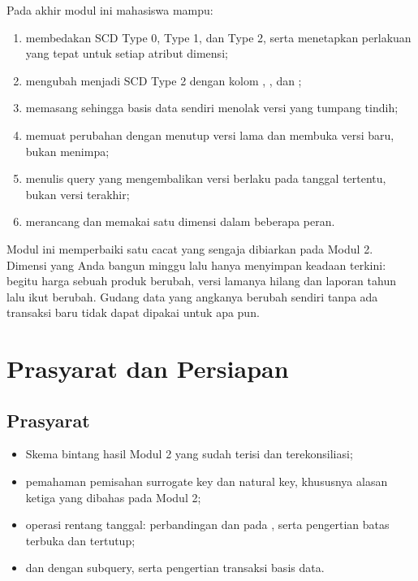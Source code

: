 \begin{capaian}
Pada akhir modul ini mahasiswa mampu:
\begin{enumerate}[leftmargin=1.4em]
  \item membedakan SCD Type 0, Type 1, dan Type 2, serta menetapkan perlakuan
        yang tepat untuk setiap atribut dimensi;
  \item mengubah  menjadi SCD Type 2 dengan kolom
        , , dan
        ;
  \item memasang  sehingga basis data sendiri
        menolak versi yang tumpang tindih;
  \item memuat perubahan dengan menutup versi lama dan membuka versi baru,
        bukan menimpa;
  \item menulis query yang mengembalikan versi berlaku pada tanggal tertentu,
        bukan versi terakhir;
  \item merancang  dan memakai satu dimensi dalam
        beberapa peran.
\end{enumerate}
\end{capaian}

Modul ini memperbaiki satu cacat yang sengaja dibiarkan pada Modul 2. Dimensi
yang Anda bangun minggu lalu hanya menyimpan keadaan terkini: begitu harga
sebuah produk berubah, versi lamanya hilang dan laporan tahun lalu ikut
berubah. Gudang data yang angkanya berubah sendiri tanpa ada transaksi baru
tidak dapat dipakai untuk apa pun.

\section{Prasyarat dan Persiapan}

\subsection{Prasyarat}

\begin{itemize}
  \item Skema bintang hasil Modul 2 yang sudah terisi dan terekonsiliasi;
  \item pemahaman pemisahan surrogate key dan natural key, khususnya alasan
        ketiga yang dibahas pada Modul 2;
  \item operasi rentang tanggal: perbandingan \perintah{>=} dan \perintah{<}
        pada , serta pengertian batas terbuka dan tertutup;
  \item {} dan  dengan subquery, serta
        pengertian transaksi basis data.
\end{itemize}

